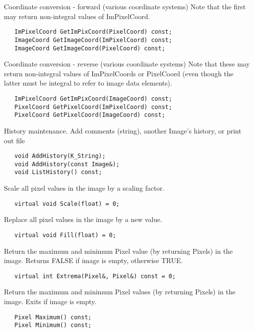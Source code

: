        Coordinate conversion - forward (various coordinate systems)
      Note that the first may return non-integral values of ImPixelCoord.
\begin{verbatim}
   ImPixelCoord GetImPixCoord(PixelCoord) const;
   ImageCoord GetImageCoord(ImPixelCoord) const;
   ImageCoord GetImageCoord(PixelCoord) const;

\end{verbatim}

       Coordinate conversion - reverse (various coordinate systems)
      Note that these may return non-integral values of ImPixelCoords or
      PixelCoord (even though the latter must be integral to refer to
      image data elements). 
\begin{verbatim}
   ImPixelCoord GetImPixCoord(ImageCoord) const;
   PixelCoord GetPixelCoord(ImPixelCoord) const;
   PixelCoord GetPixelCoord(ImageCoord) const;

\end{verbatim}

      History maintenance. Add comments (string), another Image's history,
      or print out file
\begin{verbatim}
   void AddHistory(K_String);
   void AddHistory(const Image&);
   void ListHistory() const;

\end{verbatim}

      Scale all pixel values in the image by a scaling factor.
\begin{verbatim}
   virtual void Scale(float) = 0;

\end{verbatim}

      Replace all pixel values in the image by a new value.
\begin{verbatim}
   virtual void Fill(float) = 0;

\end{verbatim}

      Return the maximum and minimum Pixel value (by returning Pixels)
      in the image. Returns FALSE if image is empty, otherwise TRUE.
\begin{verbatim}
   virtual int Extrema(Pixel&, Pixel&) const = 0;

\end{verbatim}

      Return the maximum and minimum Pixel values (by returning Pixels)
      in the image. Exits if image is empty.
\begin{verbatim}
   Pixel Maximum() const;
   Pixel Minimum() const;

\end{verbatim}

